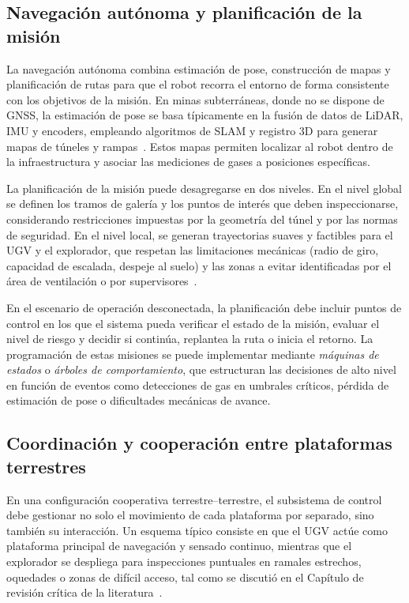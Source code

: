 \subsection{Navegación autónoma y planificación de la misión}

\hspace{1.25cm}
La navegación autónoma combina estimación de pose, construcción de mapas y planificación de rutas para que el robot recorra el entorno de forma consistente con los objetivos de la misión. En minas subterráneas, donde no se dispone de GNSS, la estimación de pose se basa típicamente en la fusión de datos de LiDAR, IMU y encoders, empleando algoritmos de SLAM y registro 3D para generar mapas de túneles y rampas~\cite{KimChoi_2025_MineMapping}. Estos mapas permiten localizar al robot dentro de la infraestructura y asociar las mediciones de gases a posiciones específicas.

La planificación de la misión puede desagregarse en dos niveles. En el nivel global se definen los tramos de galería y los puntos de interés que deben inspeccionarse, considerando restricciones impuestas por la geometría del túnel y por las normas de seguridad. En el nivel local, se generan trayectorias suaves y factibles para el UGV y el explorador, que respetan las limitaciones mecánicas (radio de giro, capacidad de escalada, despeje al suelo) y las zonas a evitar identificadas por el área de ventilación o por supervisores~\cite{AdvancesMining_2023,MINEM_DS024_2016}.

En el escenario de operación desconectada, la planificación debe incluir puntos de control en los que el sistema pueda verificar el estado de la misión, evaluar el nivel de riesgo y decidir si continúa, replantea la ruta o inicia el retorno. La programación de estas misiones se puede implementar mediante \emph{máquinas de estados} o \emph{árboles de comportamiento}, que estructuran las decisiones de alto nivel en función de eventos como detecciones de gas en umbrales críticos, pérdida de estimación de pose o dificultades mecánicas de avance.

\subsection{Coordinación y cooperación entre plataformas terrestres}

\hspace{1.25cm}
En una configuración cooperativa terrestre--terrestre, el subsistema de control debe gestionar no solo el movimiento de cada plataforma por separado, sino también su interacción. Un esquema típico consiste en que el UGV actúe como plataforma principal de navegación y sensado continuo, mientras que el explorador se despliega para inspecciones puntuales en ramales estrechos, oquedades o zonas de difícil acceso, tal como se discutió en el Capítulo de revisión crítica de la literatura~\cite{InsectInspired_2020,DungBeetle_2021}.

